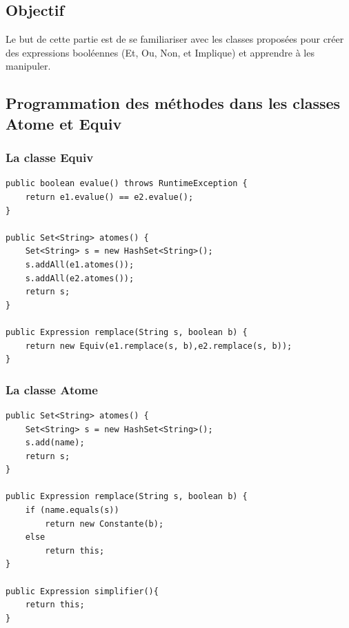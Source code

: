 \documentclass{article}
\begin{document}
\subsection{Objectif}
Le but de cette partie est de se familiariser avec les classes proposées pour créer des expressions booléennes (Et, Ou, Non, et Implique) et apprendre à les manipuler.
\subsection{Programmation des méthodes dans les classes Atome et Equiv}
\subsubsection{La classe Equiv}
\begin{verbatim}
public boolean evalue() throws RuntimeException {
	return e1.evalue() == e2.evalue();
}

public Set<String> atomes() {
	Set<String> s = new HashSet<String>();
	s.addAll(e1.atomes());
	s.addAll(e2.atomes());
	return s;
}

public Expression remplace(String s, boolean b) {
	return new Equiv(e1.remplace(s, b),e2.remplace(s, b));
}
\end{verbatim}
\subsubsection{La classe Atome}
\begin{verbatim}
public Set<String> atomes() {
	Set<String> s = new HashSet<String>();
	s.add(name);
	return s;
}

public Expression remplace(String s, boolean b) {
	if (name.equals(s))
		return new Constante(b);
	else
		return this;
}

public Expression simplifier(){
	return this;
}
\end{verbatim}
\end{document}
